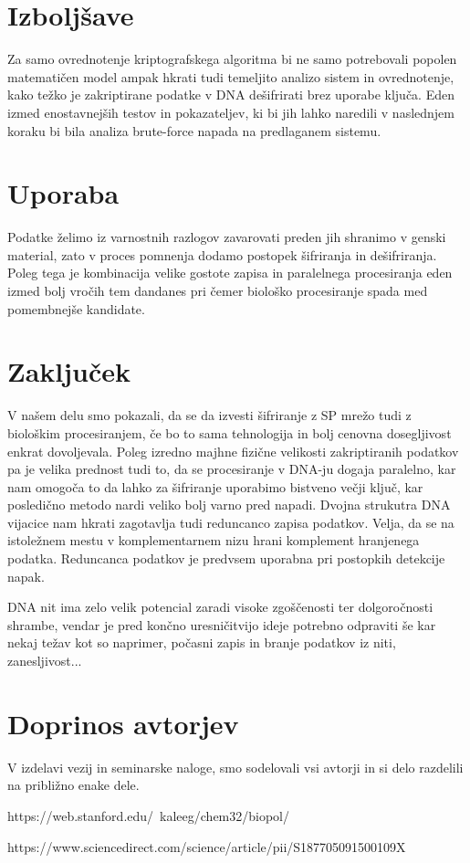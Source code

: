 \documentclass[graybox, envcountchap]{svmult}
\begin{document}
\newpage

\section{Izboljšave}

Za samo ovrednotenje kriptografskega algoritma bi ne samo potrebovali popolen matematičen model ampak hkrati tudi temeljito analizo sistem in ovrednotenje, kako težko je zakriptirane podatke v DNA dešifrirati brez uporabe ključa. Eden izmed enostavnejših testov in pokazateljev, ki bi jih lahko naredili v naslednjem koraku bi bila analiza brute-force napada na predlaganem sistemu.

\section{Uporaba}

Podatke želimo iz varnostnih razlogov zavarovati preden jih shranimo v genski material, zato v proces pomnenja dodamo postopek šifriranja in dešifriranja. Poleg tega je kombinacija velike gostote zapisa in paralelnega procesiranja eden izmed bolj vročih tem dandanes pri čemer biološko procesiranje spada med pomembnejše kandidate.

\section{Zaključek}
V našem delu smo pokazali, da se da izvesti šifriranje z SP mrežo tudi z biološkim procesiranjem, če bo to sama tehnologija in bolj cenovna dosegljivost enkrat dovoljevala. Poleg izredno majhne fizične velikosti zakriptiranih podatkov pa je velika prednost tudi to, da se procesiranje v DNA-ju dogaja paralelno, kar nam omogoča to da lahko za šifriranje uporabimo bistveno večji ključ, kar posledično metodo nardi veliko bolj varno pred napadi. Dvojna strukutra DNA vijacice nam hkrati zagotavlja tudi reduncanco zapisa podatkov. Velja, da se na istoležnem mestu v komplementarnem nizu hrani komplement hranjenega podatka. Reduncanca podatkov je predvsem uporabna pri postopkih detekcije napak.

DNA nit ima zelo velik potencial zaradi visoke zgoščenosti ter dolgoročnosti shrambe, vendar je pred končno uresničitvijo ideje potrebno odpraviti še kar nekaj težav kot so naprimer, počasni zapis in branje podatkov iz niti, zanesljivost...

\section{Doprinos avtorjev}
V izdelavi vezij in seminarske naloge, smo sodelovali vsi avtorji in si delo razdelili na približno enake dele.

\begin{thebibliography}{1}
https://web.stanford.edu/~kaleeg/chem32/biopol/

https://www.sciencedirect.com/science/article/pii/S187705091500109X

\end{thebibliography}







\end{document}
